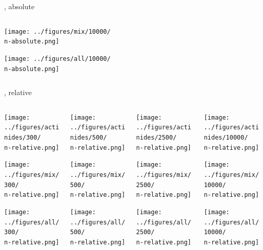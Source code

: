 \documentclass[
	11pt, %
	aspectratio=169, %
]{beamer}
\begin{document}
{\begin{frame}{\n, absolute}
\begin{columns}[c]
\begin{column}{0.25\textwidth}
			\texttt{[image: ../figures/mix/10000/\\n-absolute.png]}

			\texttt{[image: ../figures/all/10000/\\n-absolute.png]}
		\end{column}
	\end{columns}
\end{frame}

\begin{frame}{\n, relative}
	\begin{columns}[c] %
		\begin{column}{0.25\textwidth} %
			\texttt{[image: ../figures/actinides/300/\\n-relative.png]}

			\texttt{[image: ../figures/mix/300/\\n-relative.png]}

			\texttt{[image: ../figures/all/300/\\n-relative.png]}
		\end{column}
		\begin{column}{0.25\textwidth} %
			\texttt{[image: ../figures/actinides/500/\\n-relative.png]}

			\texttt{[image: ../figures/mix/500/\\n-relative.png]}

			\texttt{[image: ../figures/all/500/\\n-relative.png]}
		\end{column}
		\begin{column}{0.25\textwidth} %
			\texttt{[image: ../figures/actinides/2500/\\n-relative.png]}

			\texttt{[image: ../figures/mix/2500/\\n-relative.png]}

			\texttt{[image: ../figures/all/2500/\\n-relative.png]}
		\end{column}
		\begin{column}{0.25\textwidth} %
			\texttt{[image: ../figures/actinides/10000/\\n-relative.png]}

			\texttt{[image: ../figures/mix/10000/\\n-relative.png]}

			\texttt{[image: ../figures/all/10000/\\n-relative.png]}
		\end{column}
	\end{columns}
\end{frame}

}
\end{document}
